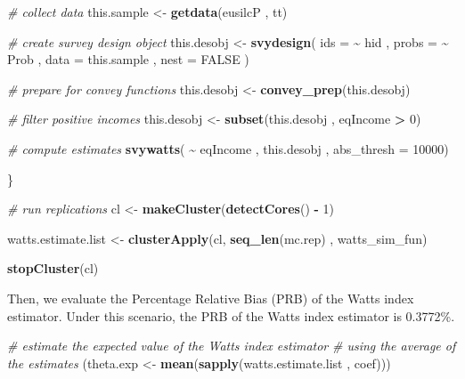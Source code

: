 \documentclass[
]{book}
\newenvironment{Shaded}{\begin{snugshade}}{\end{snugshade}}
\newcommand{\AttributeTok}[1]{\textcolor[rgb]{0.13,0.29,0.53}{#1}}
\newcommand{\CommentTok}[1]{\textcolor[rgb]{0.56,0.35,0.01}{\textit{#1}}}
\newcommand{\ConstantTok}[1]{\textcolor[rgb]{0.56,0.35,0.01}{#1}}
\newcommand{\DecValTok}[1]{\textcolor[rgb]{0.00,0.00,0.81}{#1}}
\newcommand{\FunctionTok}[1]{\textcolor[rgb]{0.13,0.29,0.53}{\textbf{#1}}}
\newcommand{\NormalTok}[1]{#1}
\newcommand{\OtherTok}[1]{\textcolor[rgb]{0.56,0.35,0.01}{#1}}
\newcommand{\SpecialCharTok}[1]{\textcolor[rgb]{0.81,0.36,0.00}{\textbf{#1}}}
\begin{document}
\begin{Shaded}
\begin{Highlighting}[]
  \CommentTok{\# collect data}
\NormalTok{  this.sample }\OtherTok{\textless{}{-}} \FunctionTok{getdata}\NormalTok{(eusilcP , tt)}
  
  \CommentTok{\# create survey design object}
\NormalTok{  this.desobj }\OtherTok{\textless{}{-}}
    \FunctionTok{svydesign}\NormalTok{(}
      \AttributeTok{ids =} \SpecialCharTok{\textasciitilde{}}\NormalTok{ hid ,}
      \AttributeTok{probs =} \SpecialCharTok{\textasciitilde{}}\NormalTok{ Prob ,}
      \AttributeTok{data =}\NormalTok{ this.sample ,}
      \AttributeTok{nest =} \ConstantTok{FALSE}
\NormalTok{    )}
  
  \CommentTok{\# prepare for convey functions}
\NormalTok{  this.desobj }\OtherTok{\textless{}{-}} \FunctionTok{convey\_prep}\NormalTok{(this.desobj)}
  
  \CommentTok{\# filter positive incomes}
\NormalTok{  this.desobj }\OtherTok{\textless{}{-}} \FunctionTok{subset}\NormalTok{(this.desobj , eqIncome }\SpecialCharTok{\textgreater{}} \DecValTok{0}\NormalTok{)}
  
  \CommentTok{\# compute estimates}
  \FunctionTok{svywatts}\NormalTok{( }\SpecialCharTok{\textasciitilde{}}\NormalTok{ eqIncome , this.desobj , }\AttributeTok{abs\_thresh =} \DecValTok{10000}\NormalTok{)}
  
\NormalTok{\}}

\CommentTok{\# run replications}
\NormalTok{cl }\OtherTok{\textless{}{-}} \FunctionTok{makeCluster}\NormalTok{(}\FunctionTok{detectCores}\NormalTok{() }\SpecialCharTok{{-}} \DecValTok{1}\NormalTok{)}

\NormalTok{watts.estimate.list }\OtherTok{\textless{}{-}}
  \FunctionTok{clusterApply}\NormalTok{(cl, }\FunctionTok{seq\_len}\NormalTok{(mc.rep) , watts\_sim\_fun)}

\FunctionTok{stopCluster}\NormalTok{(cl)}
\end{Highlighting}
\end{Shaded}

Then, we evaluate the Percentage Relative Bias (PRB) of the Watts index estimator. Under this scenario, the PRB of the Watts index estimator is 0.3772\%.

\begin{Shaded}
\begin{Highlighting}[]
\CommentTok{\# estimate the expected value of the Watts index estimator}
\CommentTok{\# using the average of the estimates}
\NormalTok{(theta.exp }\OtherTok{\textless{}{-}} \FunctionTok{mean}\NormalTok{(}\FunctionTok{sapply}\NormalTok{(watts.estimate.list , coef)))}
\end{Highlighting}
\end{Shaded}
\end{document}
